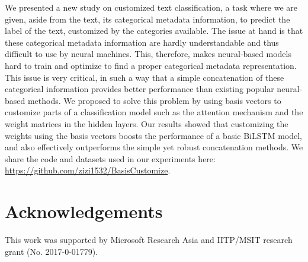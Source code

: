 \documentclass[11pt,a4paper]{article}
\begin{document}
We presented a new study on customized text classification, a task where we are given, aside from the text, its categorical metadata information, to predict the label of the text, customized by the categories available. The issue at hand is that these categorical metadata information are hardly understandable and thus difficult to use by neural machines. This, therefore, makes neural-based models hard to train and optimize to find a proper categorical metadata representation. This issue is very critical, in such a way that a simple concatenation of these categorical information provides better performance than existing popular neural-based methods. We proposed to solve this problem by using basis vectors to customize parts of a classification model such as the attention mechanism and the weight matrices in the hidden layers. Our results showed that customizing the weights using the basis vectors boosts the performance of a basic BiLSTM model, and also effectively outperforms the simple yet robust concatenation methods. We share the code and datasets used in our experiments here: \url{https://github.com/zizi1532/BasisCustomize}.

\section*{Acknowledgements}
This work was supported by Microsoft Research Asia and IITP/MSIT research grant (No. 2017-0-01779).



\end{document}
